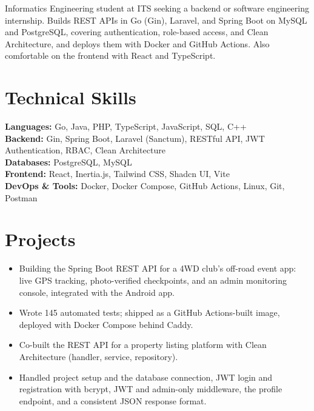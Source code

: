 



\cvheader

Informatics Engineering student at ITS seeking a backend or software engineering internship. Builds REST APIs in Go (Gin), Laravel, and Spring Boot on MySQL and PostgreSQL, covering authentication, role-based access, and Clean Architecture, and deploys them with Docker and GitHub Actions. Also comfortable on the frontend with React and TypeScript.

\cveducation

\section{Technical Skills}

\textbf{Languages:} Go, Java, PHP, TypeScript, JavaScript, SQL, C++ \\
\textbf{Backend:} Gin, Spring Boot, Laravel (Sanctum), RESTful API, JWT Authentication, RBAC, Clean Architecture \\
\textbf{Databases:} PostgreSQL, MySQL \\
\textbf{Frontend:} React, Inertia.js, Tailwind CSS, Shadcn UI, Vite \\
\textbf{DevOps \& Tools:} Docker, Docker Compose, GitHub Actions, Linux, Git, Postman

\section{Projects}

\begin{itemize}
    \item Building the Spring Boot REST API for a 4WD club's off-road event app: live GPS tracking, photo-verified checkpoints, and an admin monitoring console, integrated with the Android app.
    \item Wrote 145 automated tests; shipped as a GitHub Actions-built image, deployed with Docker Compose behind Caddy.
\end{itemize}

\vspace{2pt}

\begin{itemize}
    \item Co-built the REST API for a property listing platform with Clean Architecture (handler, service, repository).
    \item Handled project setup and the database connection, JWT login and registration with bcrypt, JWT and admin-only middleware, the profile endpoint, and a consistent JSON response format.
\end{itemize}

